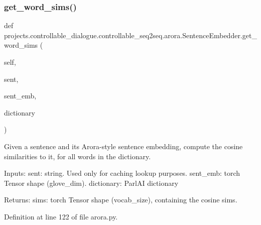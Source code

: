 \subsubsection{\texorpdfstring{get\+\_\+word\+\_\+sims()}{get\_word\_sims()}}
{\footnotesize\ttfamily def projects.\+controllable\+\_\+dialogue.\+controllable\+\_\+seq2seq.\+arora.\+Sentence\+Embedder.\+get\+\_\+word\+\_\+sims (\begin{DoxyParamCaption}\item[{}]{self,  }\item[{}]{sent,  }\item[{}]{sent\+\_\+emb,  }\item[{}]{dictionary }\end{DoxyParamCaption})}

\begin{DoxyVerb}Given a sentence and its Arora-style sentence embedding, compute the cosine
similarities to it, for all words in the dictionary.

Inputs:
  sent: string. Used only for caching lookup purposes.
  sent_emb: torch Tensor shape (glove_dim).
  dictionary: ParlAI dictionary

Returns:
  sims: torch Tensor shape (vocab_size), containing the cosine sims.
\end{DoxyVerb}
 

Definition at line 122 of file arora.\+py.


